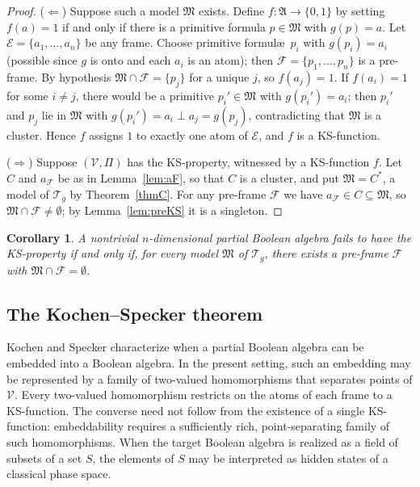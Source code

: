 \documentclass{article}   	%
\theoremstyle{plain}
\newtheorem{corollary}[theorem]{Corollary}
\theoremstyle{definition}
\theoremstyle{remark}
\begin{document}
\begin{proof}
($\Leftarrow$) Suppose such a model $\mathfrak M$ exists.
Define $f:\mathfrak A\to\{0,1\}$ by setting $f(a)=1$ if and only if there is a
primitive formula $p\in\mathfrak M$ with $g(p)=a$.
Let $\mathcal E=\{a_1,\dots,a_n\}$ be any frame.
Choose primitive formul\ae\ $p_i$ with $g(p_i)=a_i$ (possible since $g$ is onto
and each $a_i$ is an atom); then $\mathcal F=\{p_1,\dots,p_n\}$ is a pre-frame.
By hypothesis $\mathfrak M\cap\mathcal F=\{p_j\}$ for a unique $j$, so
$f(a_j)=1$.
If $f(a_i)=1$ for some $i\ne j$, there would be a primitive $p_i'\in\mathfrak M$
with $g(p_i')=a_i$; then $p_i'$ and $p_j$ lie in $\mathfrak M$ with
$g(p_i')=a_i\perp a_j=g(p_j)$, contradicting that $\mathfrak M$ is a cluster.
Hence $f$ assigns $1$ to exactly one atom of $\mathcal E$, and $f$ is a
KS-function.

($\Rightarrow$) Suppose $(\mathcal V,\Pi)$ has the KS-property, witnessed by a
KS-function $f$.
Let $C$ and $a_{\mathcal F}$ be as in Lemma~\ref{lem:aF}, so that $C$ is a
cluster, and put $\mathfrak M=C^*$, a model of $\mathcal T_g$ by
Theorem~\ref{thmC}.
For any pre-frame $\mathcal F$ we have $a_{\mathcal F}\in C\subseteq\mathfrak M$,
so $\mathfrak M\cap\mathcal F\ne\emptyset$; by Lemma~\ref{lem:preKS} it is a
singleton.
\end{proof}

\begin{corollary}
\label{cor:noKS}
A nontrivial $n$-dimensional partial Boolean algebra fails to have the
KS-property if and only if, for every model $\mathfrak M$ of $\mathcal T_g$,
there exists a pre-frame $\mathcal F$ with $\mathfrak M\cap\mathcal F=\emptyset$.
\end{corollary}

\subsection{The Kochen--Specker theorem}
\label{subsec:ksthm}

Kochen and Specker \cite[p.~66, Theorem~0]{KS} characterize when a
partial Boolean algebra can be embedded into a Boolean algebra.  In the present
setting, such an embedding may be represented by a family of two-valued
homomorphisms that separates points of $\mathcal V$.  Every two-valued
homomorphism restricts on the atoms of each frame to a KS-function.  The converse
need not follow from the existence of a single KS-function: embeddability
requires a sufficiently rich, point-separating family of such homomorphisms.
When the target Boolean algebra is realized as a field of subsets of a set $S$,
the elements of $S$ may be interpreted as hidden states of a classical phase
space.
\end{document}
